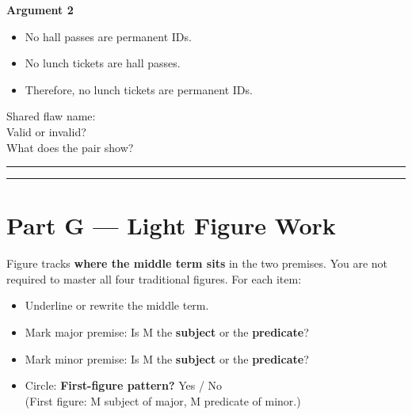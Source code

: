 \documentclass[11pt]{article}
\newcommand{\ansline}{\par\vspace{0.15em}\noindent\rule{\linewidth}{0.4pt}\par\vspace{0.08em}}
\newcommand{\twolines}{\ansline\ansline}
\newcommand{\syllblock}[3]{%
\begin{itemize}[leftmargin=1.2em]
\item #1
\item #2
\item #3
\end{itemize}
}
\begin{document}
\textbf{Argument 2}
\syllblock
{No hall passes are permanent IDs.}
{No lunch tickets are hall passes.}
{Therefore, no lunch tickets are permanent IDs.}

Shared flaw name: \underline{\hspace{3.2in}}\\
Valid or invalid? \underline{\hspace{1.4in}}\\
What does the pair show? \twolines

\section*{Part G --- Light Figure Work}
\noindent Figure tracks \textbf{where the middle term sits} in the two premises. You are not required to master all four traditional figures. For each item:

\begin{itemize}
\item Underline or rewrite the middle term.
\item Mark major premise: Is M the \textbf{subject} or the \textbf{predicate}?
\item Mark minor premise: Is M the \textbf{subject} or the \textbf{predicate}?
\item Circle: \textbf{First-figure pattern?} Yes / No\\
(First figure: M subject of major, M predicate of minor.)
\end{itemize}
\end{document}
